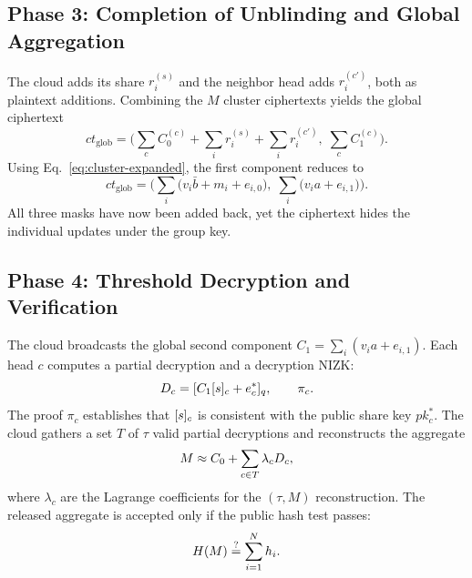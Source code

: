\subsection{Phase 3: Completion of Unblinding and Global Aggregation}
\label{subsec:phase3}
The cloud adds its share $r_i^{(s)}$ and the neighbor head adds $r_i^{(c')}$, both as plaintext additions. Combining the $M$ cluster ciphertexts yields the global ciphertext
\begin{equation}
  \label{eq:global-ct}
  ct_{\mathrm{glob}}=\Big(\sum_c C_0^{(c)}+\sum_i r_i^{(s)}+\sum_i r_i^{(c')},\; \sum_c C_1^{(c)}\Big).
\end{equation}
Using Eq.~\eqref{eq:cluster-expanded}, the first component reduces to
\begin{equation}
  \label{eq:global-expanded}
  ct_{\mathrm{glob}}=\Big(\sum_i\big(v_i\bar b+m_i+e_{i,0}\big),\; \sum_i\big(v_i a+e_{i,1}\big)\Big).
\end{equation}
All three masks have now been added back, yet the ciphertext hides the individual updates under the group key.

\subsection{Phase 4: Threshold Decryption and Verification}
\label{subsec:phase4}
The cloud broadcasts the global second component $C_1=\sum_i(v_i a+e_{i,1})$. Each head $c$ computes a partial decryption and a decryption NIZK:
\begin{equation}
  \label{eq:partial-dec}
  D_c=[C_1[s]_{c}+e_c^*]_q ,\qquad \pi_c .
\end{equation}
The proof $\pi_c$ establishes that $[s]_{c}$ is consistent with the public share key $pk_c^*$. The cloud gathers a set $T$ of $\tau$ valid partial decryptions and reconstructs the aggregate
\begin{equation}
  \label{eq:reconstruct}
  M\approx C_0+\sum_{c\in T}\lambda_c D_c ,
\end{equation}
where $\lambda_c$ are the Lagrange coefficients for the $(\tau,M)$ reconstruction. The released aggregate is accepted only if the public hash test passes:
\begin{equation}
  \label{eq:hash-test}
  H(M)\stackrel{?}{=}\sum_{i=1}^{N} h_i .
\end{equation}


